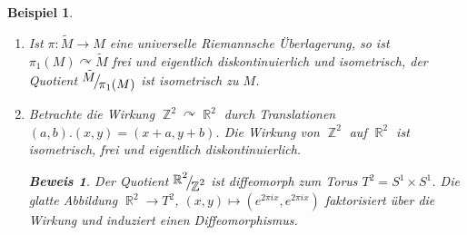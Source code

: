 \documentclass[paper=A4, twoside, chapterprefix=true, bibliography=totoc, headsepline]{scrbook}
\newcommand{\tikzgitter}[3][0.25]{
	\draw[step=#1,gray!15] #2 grid #3;
	\draw[step=2*#1,gray!30] #2 grid #3;
	\fill (0,0) circle(0.1); 
}
\DeclareMathOperator{\R}{\mathbb{R}}
\DeclareMathOperator{\Z}{\mathbb{Z}}
\newcommand{\X}{\times}
\newcommand{\FakRaum}[2]{
	\raisebox{0.7ex}{\ensuremath{#1}}
	\ensuremath{\mkern-3mu}\big/\ensuremath{\mkern-3mu}
	\raisebox{-0.6ex}{\ensuremath{#2}}}
\theoremstyle{plain}
\newtheorem{Bsp}[Dfn]{Beispiel}
\theoremstyle{nonumberplain}
\newtheorem{bew}{Beweis}
\theoremstyle{empty}
\theoremstyle{break}
\begin{document}
\begin{Bsp}
  \begin{enumerate}[label=(\arabic*),leftmargin=*]
  \item Ist $\pi: \tilde M \to M$ eine universelle Riemannsche \"Uberlagerung, so ist $\pi_1(M) \curvearrowright \tilde M$ frei und eigentlich diskontinuierlich und isometrisch, der Quotient $\FakRaum{\tilde M}{\pi_1(M)}$ ist isometrisch zu $M$.
  \item Betrachte die Wirkung $\Z^2 \curvearrowright \R^2$ durch Translationen $(a,b).(x,y) = (x+a, y+b)$. Die Wirkung von $\Z^2$ auf $\R^2$ ist isometrisch, frei und eigentlich diskontinuierlich.
    \begin{bew}
      Der Quotient $\FakRaum{\R^2}{\Z^2}$ ist diffeomorph zum Torus $T^2 = S^1 \X S^1$.
      Die glatte Abbildung $\R^2 \to T^2$, $(x,y) \mapsto (e^{2 \pi i x}, e^{2 \pi i x})$ faktorisiert \"uber die Wirkung und induziert einen Diffeomorphismus.
      \begin{center}
\end{center}
\end{bew}
\end{enumerate}
\end{Bsp}
\end{document}
